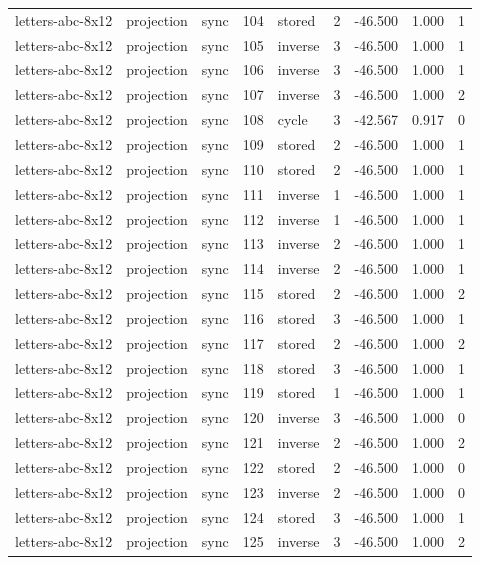\begin{tabular}{lllrlrrrr}
letters-abc-8x12 & projection & sync & 104 & stored & 2 & -46.500 & 1.000 & 1 \\
letters-abc-8x12 & projection & sync & 105 & inverse & 3 & -46.500 & 1.000 & 1 \\
letters-abc-8x12 & projection & sync & 106 & inverse & 3 & -46.500 & 1.000 & 1 \\
letters-abc-8x12 & projection & sync & 107 & inverse & 3 & -46.500 & 1.000 & 2 \\
letters-abc-8x12 & projection & sync & 108 & cycle & 3 & -42.567 & 0.917 & 0 \\
letters-abc-8x12 & projection & sync & 109 & stored & 2 & -46.500 & 1.000 & 1 \\
letters-abc-8x12 & projection & sync & 110 & stored & 2 & -46.500 & 1.000 & 1 \\
letters-abc-8x12 & projection & sync & 111 & inverse & 1 & -46.500 & 1.000 & 1 \\
letters-abc-8x12 & projection & sync & 112 & inverse & 1 & -46.500 & 1.000 & 1 \\
letters-abc-8x12 & projection & sync & 113 & inverse & 2 & -46.500 & 1.000 & 1 \\
letters-abc-8x12 & projection & sync & 114 & inverse & 2 & -46.500 & 1.000 & 1 \\
letters-abc-8x12 & projection & sync & 115 & stored & 2 & -46.500 & 1.000 & 2 \\
letters-abc-8x12 & projection & sync & 116 & stored & 3 & -46.500 & 1.000 & 1 \\
letters-abc-8x12 & projection & sync & 117 & stored & 2 & -46.500 & 1.000 & 2 \\
letters-abc-8x12 & projection & sync & 118 & stored & 3 & -46.500 & 1.000 & 1 \\
letters-abc-8x12 & projection & sync & 119 & stored & 1 & -46.500 & 1.000 & 1 \\
letters-abc-8x12 & projection & sync & 120 & inverse & 3 & -46.500 & 1.000 & 0 \\
letters-abc-8x12 & projection & sync & 121 & inverse & 2 & -46.500 & 1.000 & 2 \\
letters-abc-8x12 & projection & sync & 122 & stored & 2 & -46.500 & 1.000 & 0 \\
letters-abc-8x12 & projection & sync & 123 & inverse & 2 & -46.500 & 1.000 & 0 \\
letters-abc-8x12 & projection & sync & 124 & stored & 3 & -46.500 & 1.000 & 1 \\
letters-abc-8x12 & projection & sync & 125 & inverse & 3 & -46.500 & 1.000 & 2 \\

\end{tabular}
